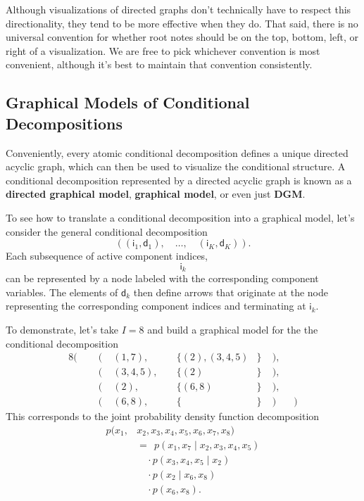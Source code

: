 \documentclass[
  letterpaper,
  DIV=11,
  numbers=noendperiod]{scrartcl}
\begin{document}
Although visualizations of directed graphs don't technically have to
respect this directionality, they tend to be more effective when they
do. That said, there is no universal convention for whether root notes
should be on the top, bottom, left, or right of a visualization. We are
free to pick whichever convention is most convenient, although it's best
to maintain that convention consistently.

\subsection{Graphical Models of Conditional
Decompositions}\label{graphical-models-of-conditional-decompositions}

Conveniently, every atomic conditional decomposition defines a unique
directed acyclic graph, which can then be used to visualize the
conditional structure. A conditional decomposition represented by a
directed acyclic graph is known as a \textbf{directed graphical model},
\textbf{graphical model}, or even just \textbf{DGM}.

To see how to translate a conditional decomposition into a graphical
model, let's consider the general conditional decomposition \[
( ( \mathsf{i}_{1}, \mathsf{d}_{1} ), \quad
  \ldots, \quad
  ( \mathsf{i}_{K}, \mathsf{d}_{K} ) ).
\] Each subsequence of active component indices, \[
\mathsf{i}_{k}
\] can be represented by a node labeled with the corresponding component
variables. The elements of \(\mathsf{d}_{k}\) then define arrows that
originate at the node representing the corresponding component indices
and terminating at \(\mathsf{i}_{k}\).

To demonstrate, let's take \(I = 8\) and build a graphical model for the
the conditional decomposition \begin{alignat*}{8}
(& \;\; &( \; &( 1, 7 ),& &\{ (2), (3, 4, 5) &\} \; &), &
\\
 & &( \; &(3, 4, 5),& \; &\{ (2) &\} \; &), &
\\
 & &( \;  &(2),& &\{ (6, 8) &\} \; &), &
\\
 & &( \;   &(6, 8),& &\{ &\}\; &) &\;\;)
\end{alignat*} This corresponds to the joint probability density
function decomposition \begin{align*}
p( x_{1}, &x_{2}, x_{3}, x_{4}, x_{5}, x_{6}, x_{7}, x_{8} )
\\
&= \;\,
p( x_{1}, x_{7} \mid x_{2}, x_{3}, x_{4}, x_{5} )
\\
&\quad \cdot
p( x_{3}, x_{4}, x_{5} \mid x_{2} )
\\
&\quad \cdot
p( x_{2} \mid x_{6}, x_{8} )
\\
&\quad \cdot
p( x_{6}, x_{8} ).
\end{align*}
\end{document}
